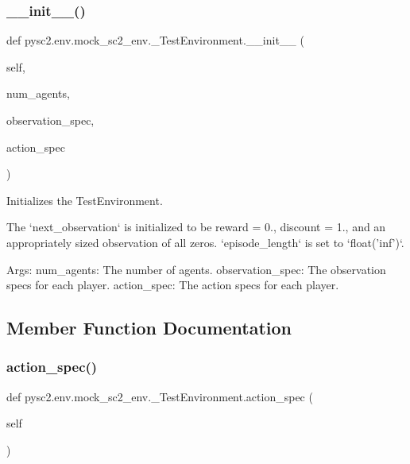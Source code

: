 \subsubsection{\texorpdfstring{\+\_\+\+\_\+init\+\_\+\+\_\+()}{\_\_init\_\_()}}
{\footnotesize\ttfamily def pysc2.\+env.\+mock\+\_\+sc2\+\_\+env.\+\_\+\+Test\+Environment.\+\_\+\+\_\+init\+\_\+\+\_\+ (\begin{DoxyParamCaption}\item[{}]{self,  }\item[{}]{num\+\_\+agents,  }\item[{}]{observation\+\_\+spec,  }\item[{}]{action\+\_\+spec }\end{DoxyParamCaption})}

\begin{DoxyVerb}Initializes the TestEnvironment.

The `next_observation` is initialized to be reward = 0., discount = 1.,
and an appropriately sized observation of all zeros. `episode_length` is set
to `float('inf')`.

Args:
  num_agents: The number of agents.
  observation_spec: The observation specs for each player.
  action_spec: The action specs for each player.
\end{DoxyVerb}
 

\subsection{Member Function Documentation}
\mbox{\label{classpysc2_1_1env_1_1mock__sc2__env_1_1___test_environment_ae7ce75b41709291c06f255bf682172bb}} 
\subsubsection{\texorpdfstring{action\+\_\+spec()}{action\_spec()}}
{\footnotesize\ttfamily def pysc2.\+env.\+mock\+\_\+sc2\+\_\+env.\+\_\+\+Test\+Environment.\+action\+\_\+spec (\begin{DoxyParamCaption}\item[{}]{self }\end{DoxyParamCaption})}

